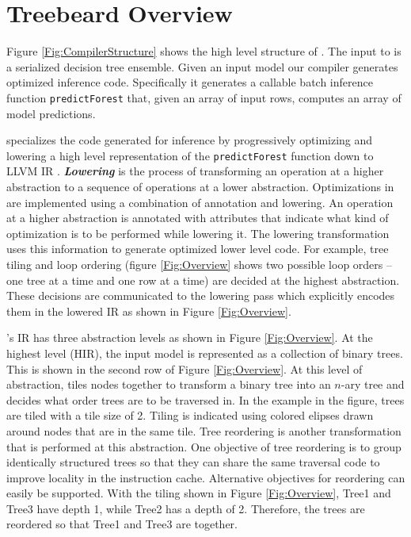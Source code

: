 \section{Treebeard Overview}
Figure \ref{Fig:CompilerStructure} shows the high level structure of \Treebeard{}. 
The input to \Treebeard{} is a serialized decision tree ensemble. 
Given an input model our compiler generates optimized inference code. Specifically it generates a 
callable batch inference function \texttt{predictForest} that, given an array of input rows, computes an
array of model predictions. 
 
\Treebeard{} specializes the code generated for inference by progressively optimizing and lowering a 
high level representation of the \texttt{predictForest} function down to LLVM IR \cite{LLVM}.
\textbf{\emph{Lowering}} is the process of transforming an operation at a higher 
abstraction to a sequence of operations at a lower abstraction. Optimizations in \Treebeard{} 
are implemented using a combination of annotation and lowering. An operation at a higher 
abstraction is annotated with attributes that indicate what kind of optimization is 
to be performed while lowering it. The lowering transformation uses this information to generate 
optimized lower level code. For example, tree tiling and loop ordering (figure \ref{Fig:Overview} 
shows two possible loop orders -- one tree at a time and one row at a time) are decided 
at the highest abstraction. These decisions are communicated to the lowering pass 
which explicitly encodes them in the lowered IR as shown in Figure \ref{Fig:Overview}.

\Treebeard{}'s IR has three abstraction levels as shown in Figure \ref{Fig:Overview}.  
At the highest level (HIR), the input model is represented as a collection of binary trees. This is shown 
in the second row of Figure \ref{Fig:Overview}. At this level of abstraction,
\Treebeard{} tiles nodes together to transform a binary tree into an $n$-ary tree 
and decides what order trees are to be traversed in. In the example in the figure, 
trees are tiled with a tile size of 2. Tiling is indicated using colored elipses drawn 
around nodes that are in the same tile. Tree reordering is another transformation that is performed at this abstraction. 
One objective of tree reordering is to group identically structured trees so that they can share the same traversal code
to improve locality in the instruction cache.  Alternative objectives for reordering can easily be supported.
With the tiling shown in Figure \ref{Fig:Overview}, Tree1 and Tree3 have depth 1, while Tree2 has a depth of 2.
Therefore, the trees are reordered so that Tree1 and Tree3 are together. 

